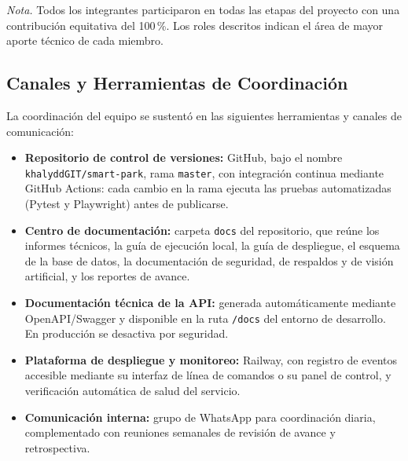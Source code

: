 \textit{Nota.} Todos los integrantes participaron en todas las etapas del proyecto con una contribución equitativa del 100\,\%. Los roles descritos indican el área de mayor aporte técnico de cada miembro.

\newpage\subsection{Canales y Herramientas de Coordinación}

La coordinación del equipo se sustentó en las siguientes herramientas y canales de comunicación:

\begin{itemize}
    \item \textbf{Repositorio de control de versiones:} GitHub, bajo el nombre \texttt{khalyddGIT/smart-park}, rama \texttt{master}, con integración continua mediante GitHub Actions: cada cambio en la rama ejecuta las pruebas automatizadas (Pytest y Playwright) antes de publicarse.
    \item \textbf{Centro de documentación:} carpeta \texttt{docs} del repositorio, que reúne los informes técnicos, la guía de ejecución local, la guía de despliegue, el esquema de la base de datos, la documentación de seguridad, de respaldos y de visión artificial, y los reportes de avance.
    \item \textbf{Documentación técnica de la API:} generada automáticamente mediante OpenAPI/Swagger y disponible en la ruta \texttt{/docs} del entorno de desarrollo. En producción se desactiva por seguridad.
    \item \textbf{Plataforma de despliegue y monitoreo:} Railway, con registro de eventos accesible mediante su interfaz de línea de comandos o su panel de control, y verificación automática de salud del servicio.
    \item \textbf{Comunicación interna:} grupo de WhatsApp para coordinación diaria, complementado con reuniones semanales de revisión de avance y retrospectiva.
\end{itemize}
